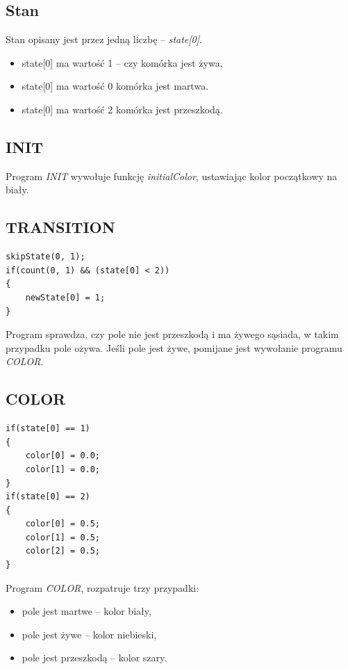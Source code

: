 \documentclass[declaration,shortabstract, inz]{iithesis}
\theoremstyle{definition} \newtheorem{definition}{Definicja}[]
\theoremstyle{plain} \newtheorem{remark}[definition]{Obserwacja}
\theoremstyle{plain} \newtheorem{theorem}[definition]{Twierdzenie}
\theoremstyle{plain} \newtheorem{example}{Przykład}[definition]
\theoremstyle{plain} \newtheorem{lemma}[definition]{Lemat}
\begin{document}
\subsection{Stan}
Stan opisany jest przez jedną liczbę -- \textit{state[0]}.
\begin{itemize}
\item state[0] ma wartość 1 -- czy komórka jest żywa,
\item state[0] ma wartość 0 komórka jest martwa.
\item state[0] ma wartość 2 komórka jest przeszkodą.
\end{itemize}

\subsection{INIT}

Program \textit{INIT} wywołuje funkcję \textit{initialColor}, ustawiając kolor początkowy na biały.

\subsection{TRANSITION}

\begin{center}
\begin{lstlisting}
skipState(0, 1);
if(count(0, 1) && (state[0] < 2))
{
	newState[0] = 1;
}
\end{lstlisting}
\end{center}

Program sprawdza, czy pole nie jest przeszkodą i ma żywego sąsiada, w takim przypadku pole ożywa. Jeśli pole jest żywe, pomijane jest wywołanie programu \textit{COLOR}.

\subsection{COLOR}

\begin{center}
\begin{lstlisting}
if(state[0] == 1)
{
	color[0] = 0.0;
	color[1] = 0.0;
}
if(state[0] == 2)
{
	color[0] = 0.5;
	color[1] = 0.5;
	color[2] = 0.5;
}
\end{lstlisting}
\end{center}
Program \textit{COLOR}, rozpatruje trzy przypadki: 
\begin{itemize}
\item pole jest martwe -- kolor biały,
\item pole jest żywe -- kolor niebieski,
\item pole jest przeszkodą -- kolor szary.
\end{itemize}
\end{document}
